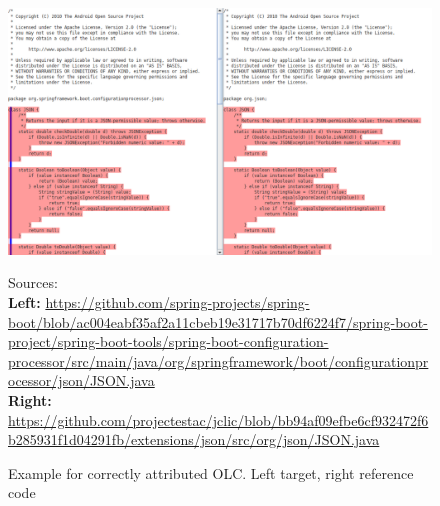 \newpage
\begin{figure}[h!]
	\centering
	\includegraphics[width=\linewidth]{figures/olc_attributed.png}
	\caption{
		Example for correctly attributed OLC. Left target, right reference code
	}{
		\begin{flushleft}
			\tiny Sources:\\
			\textbf{Left:}
			\href{https://github.com/spring-projects/spring-boot/blob/ac004eabf35af2a11cbeb19e31717b70df6224f7/spring-boot-project/spring-boot-tools/spring-boot-configuration-processor/src/main/java/org/springframework/boot/configurationprocessor/json/JSON.java}
			{https://github.com/spring-projects/spring-boot/blob/ac004eabf35af2a11cbeb19e31717b70df6224f7/spring-boot-project/spring-boot-tools/spring-boot-configuration-processor/src/main/java/org/springframework/boot/configurationprocessor/json/JSON.java}\\
			\textbf{Right:}
			\href{https://github.com/projectestac/jclic/blob/bb94af09efbe6cf932472f6b285931f1d04291fb/extensions/json/src/org/json/JSON.java}
			{https://github.com/projectestac/jclic/blob/bb94af09efbe6cf932472f6b285931f1d04291fb/extensions/json/src/org/json/JSON.java}
		\end{flushleft}
	}
	\label{fig:olc_attributed}
\end{figure}

\newpage
